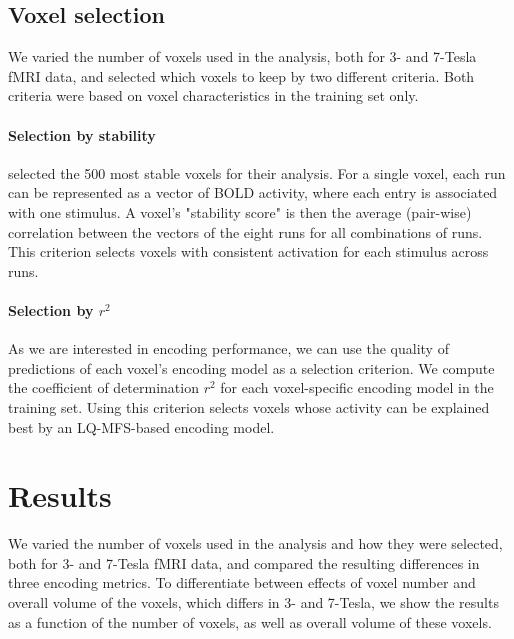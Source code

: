 
\subsection*{Voxel selection}

We varied the number of voxels used in the analysis, both for 3- and 7-Tesla
f{MRI} data, and selected which voxels to keep by two different criteria. Both
criteria were based on voxel characteristics in the training set only.

\paragraph{Selection by stability}

\citet{ML08} selected the 500 most stable voxels for their analysis. For a
single voxel, each run can be represented as a vector of BOLD activity, where
each entry is associated with one stimulus. A voxel's "stability score" is then
the average (pair-wise) correlation between the vectors of the eight runs for
all combinations of runs.  This criterion selects voxels with consistent
activation for each stimulus across runs.

\paragraph{Selection by $r^2$}

As we are interested in encoding performance, we can use the quality of
predictions of each voxel's encoding model as a selection criterion. We compute
the coefficient of determination $r^2$ for each voxel-specific encoding model
in the training set. Using this criterion selects voxels whose activity can be
explained best by an LQ-MFS-based encoding model.

\section*{Results}

We varied the number of voxels used in the analysis and how they were selected,
both for 3- and 7-Tesla f{MRI} data, and compared the resulting differences in
three encoding metrics. To differentiate between effects of voxel number and
overall volume of the voxels, which differs in 3- and 7-Tesla, we show the
results as a function of the number of voxels, as well as overall volume of
these voxels.

